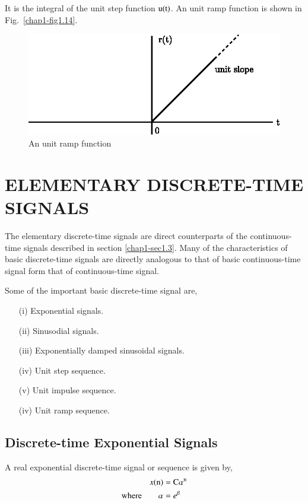 It is the integral of the unit step function $\textrm{u}(\textrm{t})$. An unit ramp function is shown in Fig.~\ref{chap1-fig1.14}.
\begin{figure}[H]
\centering
\includegraphics{src/chap1/fig.1.14.eps}
\caption{An unit ramp function}\label{chap1-fig-1.14}
\end{figure}

\section{ELEMENTARY DISCRETE-TIME SIGNALS}\label{chap1-sec1.4}
The elementary discrete-time signals are direct counterparts of the continuous-time signals described in section
\ref{chap1-sec1.3}. Many of the characteristics of basic discrete-time signals are directly analogous to that of basic continuous-time signal form that of continuous-time signal. 

Some of the important basic discrete-time signal are,
\begin{itemize}
\item[(i)] Exponential signals.

\item[(ii)] Sinusodial signals.
 
\item[(iii)] Exponentially damped sinusoidal signals.

\item[(iv)] Unit step sequence.
 
\item[(v)] Unit impulse sequence.

\item[(iv)] Unit ramp sequence. 
\end{itemize}

\subsection{Discrete-time Exponential Signals}\label{chap1-subsec-1.4.1}
A real exponential discrete-time signal or sequence is given by,
\begin{align}
x(\textrm{n}) &= \textrm{C} \alpha^{\textrm{n}}\label{chap1-eq-1.13}\\
\text{where}\qquad \alpha &= e^{\beta}\label{chap1-eq-1.14}
\end{align}

